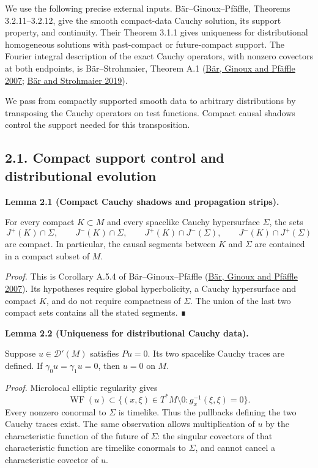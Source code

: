 \documentclass[
  english,
  11pt,
  reqno]{amsart}
\makeatletter
\newcommand{\paperdisplaynext}{%
  \let\paper@savedstartsection\@startsection
  \def\@startsection##1##2##3##4##5##6{%
    \let\@startsection\paper@savedstartsection
    \@tempskipa ##5\relax
    \ifdim\@tempskipa<\z@
      \def\paper@afterskip{.35\baselineskip}%
    \else
      \def\paper@afterskip{##5}%
    \fi
    \@startsection{##1}{##2}{##3}{##4}{\paper@afterskip}{##6}}}
\newcommand{\paperdisplaysection}{\paperdisplaynext\subsection}
\newcommand{\pandocstatementheading}[1]{%
  \par\if@nobreak\else
    \addpenalty{\@beginparpenalty}%
    \addvspace{.5\baselineskip plus .2\baselineskip minus .2\baselineskip}%
  \fi
  {\normalfont\bfseries #1\par}%
  \nobreak\@afterindenttrue\@afterheading
}
\makeatother
\begin{document}
We use the following precise external inputs. Bär--Ginoux--Pfäffle,
Theorems 3.2.11--3.2.12, give the smooth compact-data Cauchy solution,
its support property, and continuity. Their Theorem 3.1.1 gives
uniqueness for distributional homogeneous solutions with past-compact or
future-compact support. The Fourier integral description of the exact
Cauchy operators, with nonzero covectors at both endpoints, is
Bär--Strohmaier, Theorem A.1 (\hyperref[ref-BarGinouxPfaeffle2007]{Bär,
Ginoux and Pfäffle 2007}; \hyperref[ref-BarStrohmaier2019]{Bär and
Strohmaier 2019}).

We pass from compactly supported smooth data to arbitrary distributions
by transposing the Cauchy operators on test functions. Compact causal
shadows control the support needed for this transposition.

\protect{}\label{sec:support-and-distributional-evolution}
\paperdisplaysection{2.1. Compact support control and distributional
evolution}\label{compact-support-control-and-distributional-evolution}
\pandocstatementheading{\protect{}\label{lem:compact-cauchy-shadows}Lemma 2.1 (Compact Cauchy shadows and propagation strips).}

For every compact \(K\subset M\) and every spacelike Cauchy hypersurface
\(\Sigma\), the sets \[
J^+(K)\cap\Sigma,\qquad J^-(K)\cap\Sigma,\qquad
J^+(K)\cap J^-(\Sigma),\qquad
J^-(K)\cap J^+(\Sigma)
\] are compact. In particular, the causal segments between \(K\) and
\(\Sigma\) are contained in a compact subset of \(M\).

\emph{Proof.} This is Corollary A.5.4 of Bär--Ginoux--Pfäffle
(\hyperref[ref-BarGinouxPfaeffle2007]{Bär, Ginoux and Pfäffle 2007}).
Its hypotheses require global hyperbolicity, a Cauchy hypersurface and
compact \(K\), and do not require compactness of \(\Sigma\). The union
of the last two compact sets contains all the stated segments. ∎

\pandocstatementheading{\protect{}\label{lem:distributional-zero-cauchy}Lemma 2.2 (Uniqueness for distributional Cauchy data).}

Suppose \(u\in\mathcal D'(M)\) satisfies \(Pu=0\). Its two spacelike
Cauchy traces are defined. If \(\gamma_0u=\gamma_1u=0\), then \(u=0\) on
\(M\).

\emph{Proof.} Microlocal elliptic regularity gives \[
\operatorname{WF}(u)\subset
\{(x,\xi)\in T^*M\setminus0:g^{-1}_x(\xi,\xi)=0\}.
\] Every nonzero conormal to \(\Sigma\) is timelike. Thus the pullbacks
defining the two Cauchy traces exist. The same observation allows
multiplication of \(u\) by the characteristic function of the future of
\(\Sigma\): the singular covectors of that characteristic function are
timelike conormals to \(\Sigma\), and cannot cancel a characteristic
covector of \(u\).
\end{document}
